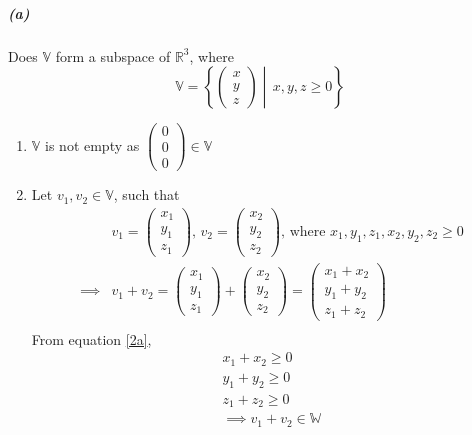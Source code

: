 \documentclass[12pt, letterpaper]{article}
\begin{document}
\subparagraph{(a)} Does $\mathbb{V}$ form a subspace of $\mathbb{R}^3$, where
\[
  \mathbb{V} = \left\{\begin{pmatrix}x\\y\\z\end{pmatrix}\middle| \, x,y,z \geq 0\right\}
\]


\begin{enumerate}
  \item $\mathbb{V}$ is not empty as $\begin{pmatrix}0\\0\\0\end{pmatrix}\in\mathbb{V}$
  \item Let $v_1, v_2 \in \mathbb{V}$, such that
  \begin{equation}
    \label{2a}
    \begin{split}
    &v_1 = \begin{pmatrix}x_1\\y_1\\z_1\end{pmatrix},\,
    v_2 = \begin{pmatrix}x_2\\y_2\\z_2\end{pmatrix},\,
    \text{where }x_1,y_1,z_1,x_2,y_2,z_2\geq0\\
    \implies &v_1 + v_2
    = \begin{pmatrix}x_1\\y_1\\z_1\end{pmatrix} +
    \begin{pmatrix}x_2\\y_2\\z_2\end{pmatrix}
    =\begin{pmatrix}x_1 + x_2\\y_1 + y_2\\z_1 + z_2\end{pmatrix}\\
    \end{split}
  \end{equation}
  From equation \ref{2a},
  \[
    \begin{split}
    x_1 + x_2 \geq 0\\
    y_1 + y_2 \geq 0\\
    z_1 + z_2 \geq 0\\
    \implies \boxed{v_1 + v_2 \in \mathbb{W}}
    \end{split}
  \]


\end{enumerate}
\end{document}
